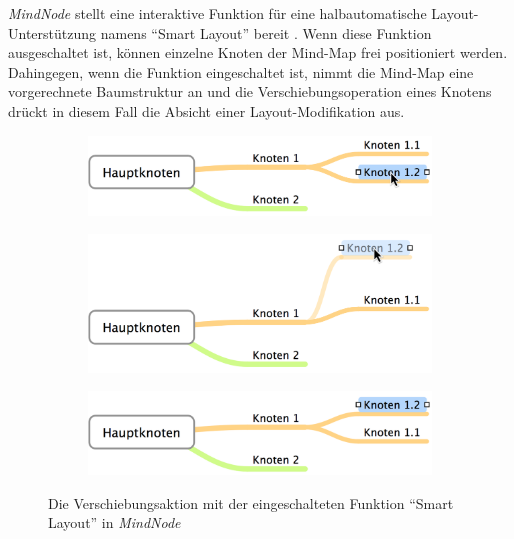 \textit{MindNode} stellt eine interaktive Funktion für eine halbautomatische Layout-Unterstützung namens \enquote{Smart Layout} bereit \cite{14MindNode}. Wenn diese Funktion ausgeschaltet ist, können einzelne Knoten der Mind-Map frei positioniert werden. Dahingegen, wenn die Funktion eingeschaltet ist, nimmt die Mind-Map eine vorgerechnete Baumstruktur an und die Verschiebungsoperation eines Knotens drückt in diesem Fall die Absicht einer Layout-Modifikation aus.

\begin{figure}[hbt]
    \newcommand{\subfigurewidth}{\textwidth}
    \newcommand{\graphicsscale}{0.25}
    \begin{subfigure}{\subfigurewidth}
        \centering
        \includegraphics[scale=\graphicsscale]{resources/mindnode-smart-layout-a}
        \caption{}
        \label{fig:mindnode-smart-layout-a}
    \end{subfigure}
    \begin{subfigure}{\subfigurewidth}
        \centering
        \includegraphics[scale=\graphicsscale]{resources/mindnode-smart-layout-b}
        \caption{}
        \label{fig:mindnode-smart-layout-b}
    \end{subfigure}
    \begin{subfigure}{\subfigurewidth}
        \centering
        \includegraphics[scale=\graphicsscale]{resources/mindnode-smart-layout-c}
        \caption{}
        \label{fig:mindnode-smart-layout-c}
    \end{subfigure}
    \caption{Die Verschiebungsaktion mit der eingeschalteten Funktion \enquote{Smart Layout} in \textit{MindNode}}
    \label{fig:mindnode-smart-layout}
\end{figure}

